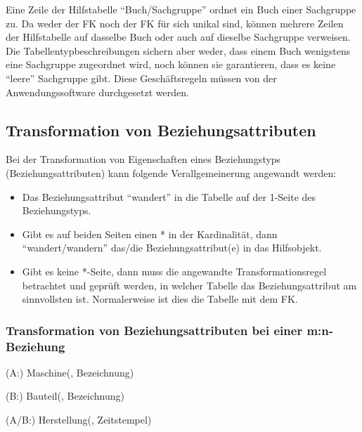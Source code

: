 Eine Zeile der Hilfstabelle \enquote{Buch/Sachgruppe} ordnet ein Buch
einer Sachgruppe zu. Da weder der FK  noch der FK
 für sich unikal sind, können mehrere Zeilen
der Hilfstabelle auf dasselbe Buch oder auch auf dieselbe Sachgruppe
verweisen. Die Tabellentypbeschreibungen sichern aber weder, dass
einem Buch wenigstens eine Sachgruppe zugeordnet wird, noch können
sie garantieren, dass es keine \enquote{leere} Sachgruppe gibt. Diese
Geschäftsregeln müssen von der Anwendungssoftware durchgesetzt
werden.
\subsection{Transformation von Beziehungsattributen}
Bei der Transformation von Eigenschaften eines Beziehungstyps (Beziehungsattributen) kann folgende Verallgemeinerung angewandt werden:
\begin{itemize}
    \item Das Beziehungsattribut \enquote{wandert} in die Tabelle auf der 1-Seite des Beziehungstyps.
    \item Gibt es auf beiden Seiten einen * in der Kardinalität, dann \enquote{wandert/wandern} das/die Beziehungsattribut(e) in das Hilfsobjekt.
    \item Gibt es keine *-Seite, dann muss die angewandte Transformationsregel betrachtet und geprüft werden, in welcher Tabelle das Beziehungsattribut am sinnvollsten ist. Normalerweise ist dies die Tabelle mit dem FK.
\end{itemize}
\subsubsection{Transformation von Beziehungsattributen bei einer m:n-Beziehung}
\begin{center}
\end{center}
\begin{small}
    (A:) Maschine(, Bezeichnung)

    (B:) Bauteil(, Bezeichnung)

    (A/B:) Herstellung(, Zeitstempel)
\end{small}
